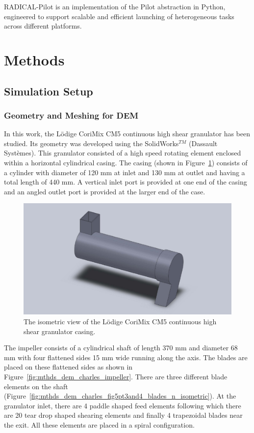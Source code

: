 \documentclass[preprint,11pt,authoryear]{elsarticle}
\begin{document}
RADICAL-Pilot is an implementation of the Pilot abstraction in Python, engineered to
support scalable and efficient launching of heterogeneous tasks across different platforms.

\section{Methods}
\subsection{Simulation Setup}
\subsubsection{Geometry and Meshing for DEM}
In this work, the L\"{o}dige CoriMix CM5 continuous high shear granulator has 
been studied. Its geometry was developed using the SolidWorks$^{TM}$ (Dassault Syst\`{e}mes). 
This granulator consisted of a high speed rotating element enclosed within a 
horizontal cylindrical casing. The casing 
(shown in Figure~\ref{fig:mthdsDemCharlesGranShell}) consists of a cylinder with 
diameter of 120 mm at inlet and 130 mm at outlet and having a total length of 440 mm. 
A vertical inlet port is provided at one end of the casing and an angled outlet port 
is provided at the larger end of the case. 

\begin{figure}
\centering
\includegraphics[scale=0.15]{shell_final_pic.pdf}
\caption{The isometric view of the L\"{o}dige CoriMix CM5 continuous high shear granulator casing.}
\label{fig:mthdsDemCharlesGranShell}
\end{figure}

The impeller consists of a cylindrical shaft of length 370 mm and diameter 68 mm with four 
flattened sides 15 mm wide running along the axis. The blades are placed on these flattened sides as 
shown in Figure~\ref{fig:mthds_dem_charles_impeller}. There are three different blade elements on the 
shaft (Figure~\ref{fig:mthds_dem_charles_fig5pt3and4_blades_n_isometric}). At the granulator inlet, 
there are 4 paddle shaped feed elements following which there are 20 tear drop shaped shearing 
elements  and finally 4 trapezoidal blades near the exit. All these elements are placed in 
a spiral configuration. 
\end{document}
